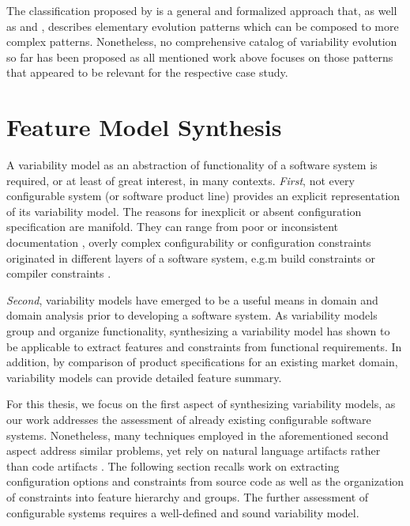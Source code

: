 The classification proposed by \cite{peng_analyzing_2011} is a general and formalized approach
that, as well as \cite{seidl_co-evolution_2012} and \cite{passos_towards_2012}, describes
elementary evolution patterns which can be composed to more complex patterns. Nonetheless, no
comprehensive catalog of variability evolution so far has been proposed as all
mentioned work above focuses on those patterns that appeared to be relevant for
the respective case study.

\section{Feature Model Synthesis}  \label{sec:2.3}
A variability model as an abstraction of functionality of a software system is
required, or at least of great interest, in many contexts. \emph{First}, not
every configurable system (or software product line) provides an explicit
representation of its variability model. 
The reasons for inexplicit or absent configuration specification are manifold.
They can range from poor or inconsistent documentation
\citep{rabkin_static_2011}, overly complex configurability \citep{xu_hey_2015}
or configuration constraints originated in different layers of a software
system, e.g.m build constraints  or compiler constraints \citep{nadi_where_2015}. 

\emph{Second}, variability models have emerged to be a useful means in domain
and domain analysis prior to developing a software system. As variability
models group and organize functionality, synthesizing a variability model has
shown to be applicable to extract features and constraints from functional
requirements. In addition, by comparison of product specifications for an
existing market domain, variability models can provide detailed feature summary.

For this thesis, we focus on the first aspect of synthesizing variability
models, as our work addresses the assessment of already existing configurable
software systems. Nonetheless, many techniques employed in the aforementioned
second aspect address similar problems, yet rely on natural language artifacts
rather than code artifacts \citep{alves_exploratory_2008,bakar_feature_2015}.
The following section recalls work on extracting configuration options and
constraints from source code as well as the organization of constraints into
feature hierarchy and groups. The further assessment of configurable systems
requires a well-defined and sound variability model.

